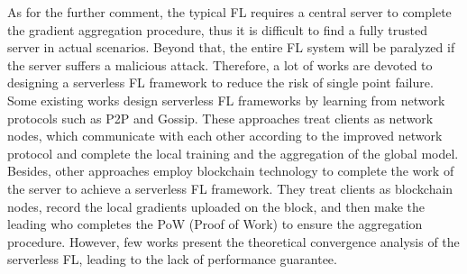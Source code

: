 \documentclass[10pt,journal,compsoc]{IEEEtran}
\begin{document}
As for the further comment, the typical FL requires a central server to complete the gradient aggregation procedure, thus it is difficult to find a fully trusted server in actual scenarios. Beyond that, the entire FL system will be paralyzed if the server suffers a malicious attack. Therefore, a lot of works are devoted to designing a serverless FL framework to reduce the risk of single point failure\cite{pappas2021ipls}. Some existing works design serverless FL frameworks by learning from network protocols such as P2P \cite{roy2019braintorrent}\cite{lalitha2019peertopeer} and Gossip\cite{hu2019decentralized}\cite{10.1007/978-3-030-22496-7_5}. These approaches treat clients as network nodes, which communicate with each other according to the improved network protocol and complete the local training and the aggregation of the global model. Besides, other approaches employ blockchain technology to complete the work of the server to achieve a serverless FL framework\cite{8733825}\cite{9019859}\cite{8843900}\cite{8905038}. They treat clients as blockchain nodes, record the local gradients uploaded on the block, and then make the leading who completes the PoW (Proof of Work) to ensure the aggregation procedure. However, few works present the theoretical convergence analysis of the serverless FL, leading to the lack of performance guarantee. 


\end{document}
